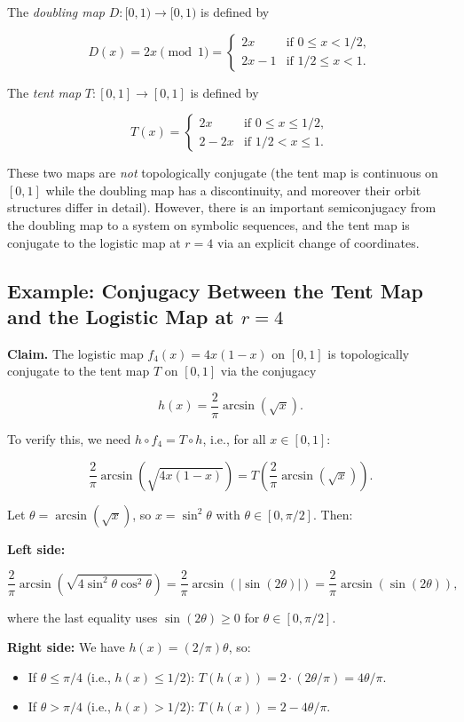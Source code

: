 The \textit{doubling map} $D: [0,1) \to [0,1)$ is defined by

\[
D(x) = 2x \pmod{1} = \begin{cases} 2x & \text{if } 0 \leq x < 1/2, \\ 2x - 1 & \text{if } 1/2 \leq x < 1. \end{cases}
\]

The \textit{tent map} $T: [0,1] \to [0,1]$ is defined by

\[
T(x) = \begin{cases} 2x & \text{if } 0 \leq x \leq 1/2, \\ 2 - 2x & \text{if } 1/2 < x \leq 1. \end{cases}
\]

These two maps are \textit{not} topologically conjugate (the tent map is continuous on $[0,1]$ while the doubling map has a discontinuity, and moreover their orbit structures differ in detail). However, there is an important semiconjugacy from the doubling map to a system on symbolic sequences, and the tent map is conjugate to the logistic map at $r = 4$ via an explicit change of coordinates.

\subsection{Example: Conjugacy Between the Tent Map and the Logistic Map at $r = 4$}\label{sec:2.6.2}

\textbf{Claim.} The logistic map $f_4(x) = 4x(1-x)$ on $[0,1]$ is topologically conjugate to the tent map $T$ on $[0,1]$ via the conjugacy

\[
h(x) = \frac{2}{\pi}\arcsin(\sqrt{x}).
\]

To verify this, we need $h \circ f_4 = T \circ h$, i.e., for all $x \in [0,1]$:

\[
\frac{2}{\pi}\arcsin\!\left(\sqrt{4x(1-x)}\right) = T\!\left(\frac{2}{\pi}\arcsin(\sqrt{x})\right).
\]

Let $\theta = \arcsin(\sqrt{x})$, so $x = \sin^2\theta$ with $\theta \in [0, \pi/2]$. Then:

\textbf{Left side:}

\[
\frac{2}{\pi}\arcsin\!\left(\sqrt{4\sin^2\theta\cos^2\theta}\right) = \frac{2}{\pi}\arcsin(|\sin(2\theta)|) = \frac{2}{\pi}\arcsin(\sin(2\theta)),
\]

where the last equality uses $\sin(2\theta) \geq 0$ for $\theta \in [0, \pi/2]$.

\textbf{Right side:} We have $h(x) = (2/\pi)\theta$, so:
\begin{itemize}[nosep]
  \item If $\theta \leq \pi/4$ (i.e., $h(x) \leq 1/2$): $T(h(x)) = 2 \cdot (2\theta/\pi) = 4\theta/\pi$.
  \item If $\theta > \pi/4$ (i.e., $h(x) > 1/2$): $T(h(x)) = 2 - 4\theta/\pi$.
\end{itemize}

